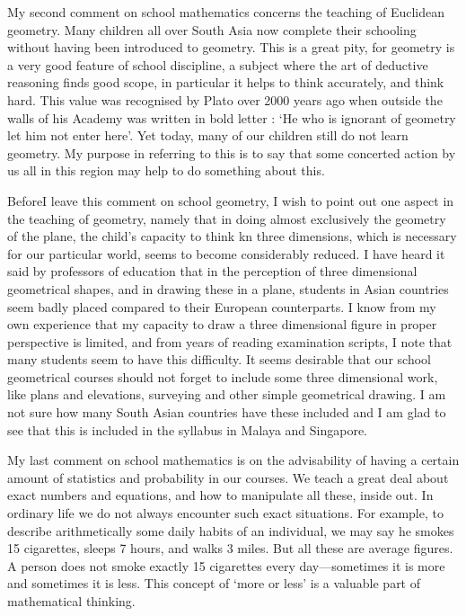 My second comment on school mathematics concerns the teaching of
Euclidean geometry. Many children all over South Asia now complete
their schooling without having been introduced to geometry. This is a
great pity, for geometry is a very good feature of school discipline,
a subject where the art of deductive reasoning finds good scope, in
particular it helps to think accurately, and think hard. This value
was recognised by Plato over 2000 years ago when outside the walls of
his Academy was written in bold letter : `He who is ignorant of
geometry let him not enter here'. Yet today, many of our children
still do not learn geometry. My purpose in referring to this is to say
that some concerted action by us all in this region may help to do
something about this.

Before\pageoriginale I leave this comment on school geometry, I wish
to point out one aspect in the teaching of geometry, namely that in
doing almost exclusively the geometry of the plane, the child's
capacity to think kn three dimensions, which is necessary for our
particular world, seems to become considerably reduced. I have heard
it said by professors of education that in the perception of three
dimensional geometrical shapes, and in drawing these in a plane,
students in Asian countries seem badly placed compared to their
European counterparts. I know from my own experience that my capacity
to draw a three dimensional figure in proper perspective is limited,
and from years of reading examination scripts, I note that many
students seem to have this difficulty. It seems desirable that our
school geometrical courses should not forget to include some three
dimensional work, like plans and elevations, surveying and other
simple geometrical drawing. I am not sure how many South Asian
countries have these included and I am glad to see that this is
included in the syllabus in Malaya and Singapore.


My last comment on school mathematics is on the advisability of having
a certain amount of statistics and probability in our courses. We
teach a great deal about exact numbers and equations, and how to
manipulate all these, inside out. In ordinary life we do not always
encounter such exact situations. For example, to describe
arithmetically some daily habits of an individual, we may say he
smokes 15 cigarettes, sleeps 7 hours, and walks 3 miles. But all these
are average figures. A person does not smoke exactly 15 cigarettes
every day---sometimes it is more and sometimes it is less. This
concept of `more or less' is a valuable part of mathematical thinking. 

